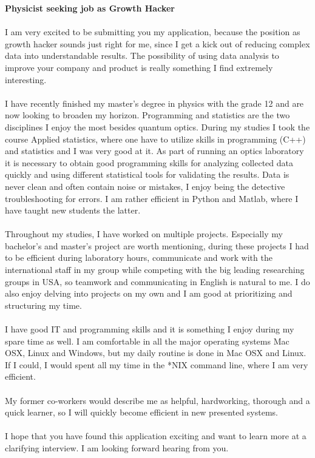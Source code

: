 \documentclass[11pt,a4paper,sans]{moderncv} %
\begin{document}
\makelettertitle %

\textbf{Physicist seeking job as Growth Hacker}
\\~\\
I am very excited to be submitting you my application, because the position as growth hacker sounds just right for me, since I get a kick out of reducing complex data into understandable results. The possibility of using data analysis to improve your company and product is really something I find extremely interesting.
\\~\\
I have recently finished my master's degree in physics with the grade 12 and are now looking to broaden my horizon. Programming and statistics are the two disciplines I enjoy the most besides quantum optics. During my studies I took the course Applied statistics, where one have to utilize skills in programming (C++) and statistics and I was very good at it. As part of running an optics laboratory it is necessary to obtain good programming skills for analyzing collected data quickly and using different statistical tools for validating the results. Data is never clean and often contain noise or mistakes, I enjoy being the detective troubleshooting for errors. I am rather efficient in Python and Matlab, where I have taught new students the latter.
\\~\\
Throughout my studies, I have worked on multiple projects. Especially my bachelor's and master's project are worth mentioning, during these projects I had to be efficient during laboratory hours, communicate and work with the international staff in my group while competing with the big leading researching groups in USA, so teamwork and communicating in English is natural to me. I do also enjoy delving into projects on my own and I am good at prioritizing and structuring my time.
\\~\\
I have good IT and programming skills and it is something I enjoy during my spare time as well. I am comfortable in all the major operating systems Mac OSX, Linux and Windows, but my daily routine is done in Mac OSX and Linux. If I could, I would spent all my time in the *NIX command line, where I am very efficient.
\\~\\
My former co-workers would describe me as helpful, hardworking, thorough and a quick learner, so I will quickly become efficient in new presented systems.
\\~\\
I hope that you have found this application exciting and want to learn more at a clarifying interview. I am looking forward hearing from you.

\makeletterclosing %

\end{document}
